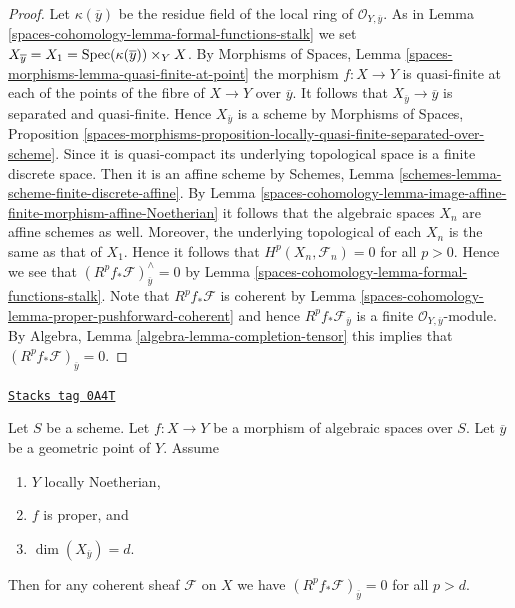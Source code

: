 \begin{proof}
Let $\kappa(\overline{y})$ be the residue field of the local
ring of $\mathcal{O}_{Y, \overline{y}}$. As in
Lemma \ref{spaces-cohomology-lemma-formal-functions-stalk}
we set $X_{\overline{y}} = X_1 = \operatorname{Spec}(\kappa(\overline{y})) \times_Y X$.
By Morphisms of Spaces, Lemma
\ref{spaces-morphisms-lemma-quasi-finite-at-point}
the morphism $f : X \to Y$ is quasi-finite at each of
the points of the fibre of $X \to Y$ over $\overline{y}$.
It follows that $X_{\overline{y}} \to \overline{y}$ is separated and
quasi-finite. Hence $X_{\overline{y}}$ is a scheme
by Morphisms of Spaces, Proposition
\ref{spaces-morphisms-proposition-locally-quasi-finite-separated-over-scheme}.
Since it is quasi-compact its underlying topological space is a finite
discrete space. Then it is an affine scheme by
Schemes, Lemma \ref{schemes-lemma-scheme-finite-discrete-affine}.
By Lemma \ref{spaces-cohomology-lemma-image-affine-finite-morphism-affine-Noetherian}
it follows that the algebraic spaces $X_n$ are affine schemes as well.
Moreover, the underlying topological of each $X_n$ is the same
as that of $X_1$. Hence it follows that $H^p(X_n, \mathcal{F}_n) = 0$
for all $p > 0$. Hence we see that
$(R^pf_*\mathcal{F})_{\overline{y}}^\wedge = 0$
by Lemma \ref{spaces-cohomology-lemma-formal-functions-stalk}.
Note that $R^pf_*\mathcal{F}$ is coherent by
Lemma \ref{spaces-cohomology-lemma-proper-pushforward-coherent} and
hence $R^pf_*\mathcal{F}_{\overline{y}}$ is a finite
$\mathcal{O}_{Y, \overline{y}}$-module.
By Algebra, Lemma \ref{algebra-lemma-completion-tensor}
this implies that $(R^pf_*\mathcal{F})_{\overline{y}} = 0$.
\end{proof}

\begin{lemma}
\label{spaces-cohomology-lemma-higher-direct-images-zero-above-dimension-fibre}
\href{https://stacks.math.columbia.edu/tag/0A4T}{\texttt{Stacks tag 0A4T}}


Let $S$ be a scheme.
Let $f : X \to Y$ be a morphism of algebraic spaces over $S$.
Let $\overline{y}$ be a geometric point of $Y$.
Assume
\begin{enumerate}
\item $Y$ locally Noetherian,
\item $f$ is proper, and
\item $\dim(X_{\overline{y}}) = d$.
\end{enumerate}
Then for any coherent sheaf $\mathcal{F}$ on $X$ we have
$(R^pf_*\mathcal{F})_{\overline{y}} = 0$ for all $p > d$.
\end{lemma}

